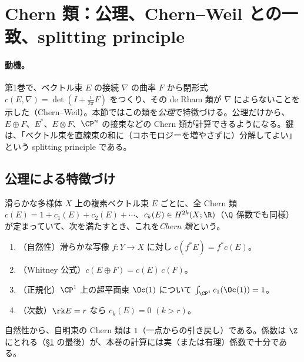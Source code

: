 \section{Chern 類：公理、Chern--Weil との一致、splitting principle}\label{sec:chern}
\paragraph{動機。}第1巻で、ベクトル束 $E$ の接続 $\nabla$ の曲率 $F$ から閉形式 $c(E,\nabla)=\det(I+\frac i{2\pi}F)$ をつくり、その de Rham 類が $\nabla$ によらないことを示した（Chern--Weil）。本節ではこの類を\emph{公理}で特徴づける。公理だけから、$E\oplus F$、$E^*$、$E\otimes F$、$\CP^n$ の接束などの Chern 類が計算できるようになる。鍵は、「ベクトル束を直線束の和に（コホモロジーを増やさずに）分解してよい」という splitting principle である。

\subsection{公理による特徴づけ}
\begin{defn}\label{def:axioms}
滑らかな多様体 $X$ 上の複素ベクトル束 $E$ ごとに、全 Chern 類 $c(E)=1+c_1(E)+c_2(E)+\cdots$、$c_k(E)\in H^{2k}(X;\R)$（$\Q$ 係数でも同様）が定まっていて、次を満たすとき、これを\emph{Chern 類}という。
\begin{enumerate}[label=(C\arabic*),leftmargin=3em]
\item（自然性）滑らかな写像 $f:Y\to X$ に対し $c(f^*E)=f^*c(E)$。
\item（Whitney 公式）$c(E\oplus F)=c(E)\,c(F)$。
\item（正規化）$\CP^1$ 上の超平面束 $\Oc(1)$ について $\int_{\CP^1}c_1(\Oc(1))=1$。
\item（次数）$\rk E=r$ なら $c_k(E)=0$ $(k>r)$。
\end{enumerate}
\end{defn}
\noindent 自然性から、自明束の Chern 類は $1$（一点からの引き戻し）である。係数は $\Z$ にとれる（\S\ref{sec:chern} の最後）が、本巻の計算には実（または有理）係数で十分である。

